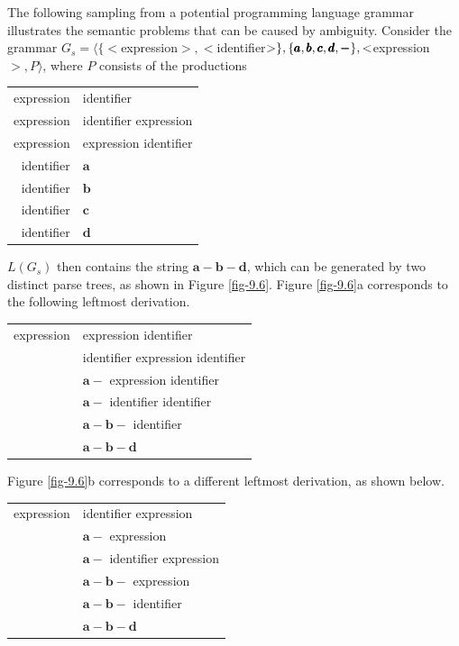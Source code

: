 The following sampling from a potential programming language grammar illustrates
the semantic problems that can be caused by ambiguity. Consider the grammar
$G_s=\langle\{<$expression$>,<$identifier$>\},\{\pmb{a},\pmb{b},\\\pmb{c},\pmb{d},
\pmb{-}\},<$expression$>,P\rangle$, where $P$ consists of the productions
\begin{center}\begin{tabular}{r@{ $\rightarrow$ }l}
\<expression\> & \<identifier\> \\
\<expression\> & \<identifier\> \pmb{--} \<expression\> \\
\<expression\> & \<expression\> \pmb{--} \<identifier\> \\
\<identifier\> & $\pmb{a}$ \\
\<identifier\> & $\pmb{b}$ \\
\<identifier\> & $\pmb{c}$ \\
\<identifier\> & $\pmb{d}$
\end{tabular}\end{center}
$L(G_s)$ then contains the string $\pmb{a-b-d}$, which can be generated by
two distinct parse trees, as shown in Figure \ref{fig-9.6}. Figure \ref{fig-9.6}a corresponds to the
following leftmost derivation.
\begin{center}\begin{tabular}{r@{ $\Rightarrow$ }l}
\<expression\> & \<expression\> \pmb{--} \<identifier\> \\
& \<identifier\> \pmb{--} \<expression\> \pmb{--} \<identifier\> \\
& $\pmb{a-}$ \<expression\> \pmb{--} \<identifier\> \\
& $\pmb{a-}$ \<identifier\> \pmb{--} \<identifier\> \\
& $\pmb{a-b-}$ \<identifier\> \\
& $\pmb{a-b-d}$
\end{tabular}\end{center}
Figure \ref{fig-9.6}b corresponds to a different leftmost derivation, as shown below.
\begin{center}\begin{tabular}{r@{ $\Rightarrow$ }l}
\<expression\> & \<identifier\> \pmb{--} \<expression\> \\
& $\pmb{a-}$ \<expression\> \\
& $\pmb{a-}$ \<identifier\> \pmb{--} \<expression\> \\
& $\pmb{a-b-}$ \<expression\> \\
& $\pmb{a-b-}$ \<identifier\> \\
& $\pmb{a-b-d}$
\end{tabular}\end{center}
